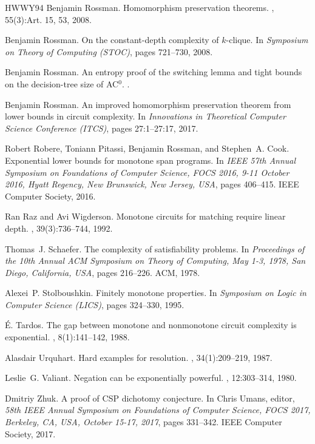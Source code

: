 \documentclass[10pt,a4paper]{article}
\begin{document}
\begin{thebibliography}{HWWY94}
Benjamin Rossman.
\newblock Homomorphism preservation theorems.
, 55(3):Art. 15, 53, 2008.

Benjamin Rossman.
\newblock On the constant-depth complexity of $k$-clique.
\newblock In {\em Symposium on Theory of Computing \emph{(STOC)}}, pages
  721--730, 2008.

Benjamin Rossman.
\newblock An entropy proof of the switching lemma and tight bounds on the
  decision-tree size of {AC}$^0$.
.

Benjamin Rossman.
\newblock An improved homomorphism preservation theorem from lower bounds in
  circuit complexity.
\newblock In {\em Innovations in Theoretical Computer Science Conference
  \emph{(ITCS)}}, pages 27:1--27:17, 2017.

Robert Robere, Toniann Pitassi, Benjamin Rossman, and Stephen~A. Cook.
\newblock Exponential lower bounds for monotone span programs.
\newblock In {\em {IEEE} 57th Annual Symposium on Foundations of Computer
  Science, {FOCS} 2016, 9-11 October 2016, Hyatt Regency, New Brunswick, New
  Jersey, {USA}}, pages 406--415. {IEEE} Computer Society, 2016.

Ran Raz and Avi Wigderson.
\newblock Monotone circuits for matching require linear depth.
, 39(3):736--744, 1992.

Thomas~J. Schaefer.
\newblock The complexity of satisfiability problems.
\newblock In {\em Proceedings of the 10th Annual {ACM} Symposium on Theory of
  Computing, May 1-3, 1978, San Diego, California, {USA}}, pages 216--226.
  {ACM}, 1978.

Alexei~P. Stolboushkin.
\newblock Finitely monotone properties.
\newblock In {\em Symposium on Logic in Computer Science \emph{(LICS)}}, pages
  324--330, 1995.

\'{E}. Tardos.
\newblock The gap between monotone and nonmonotone circuit complexity is
  exponential.
, 8(1):141--142, 1988.

Alasdair Urquhart.
\newblock Hard examples for resolution.
, 34(1):209--219, 1987.

Leslie~G. Valiant.
\newblock Negation can be exponentially powerful.
, 12:303--314, 1980.

Dmitriy Zhuk.
\newblock A proof of {CSP} dichotomy conjecture.
\newblock In Chris Umans, editor, {\em 58th {IEEE} Annual Symposium on
  Foundations of Computer Science, {FOCS} 2017, Berkeley, CA, USA, October
  15-17, 2017}, pages 331--342. {IEEE} Computer Society, 2017.

\end{thebibliography}
\end{document}
